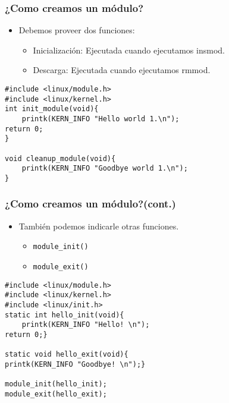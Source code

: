 \begin{frame}[fragile]
\frametitle{¿Como creamos un módulo?}
  \begin{itemize}
  \item Debemos proveer dos funciones:
 	 \begin{itemize}
 	   \item Inicialización: Ejecutada cuando ejecutamos insmod.
 	 \end{itemize} 
	 \begin{itemize}
 	   \item Descarga: Ejecutada cuando ejecutamos rmmod.
 	 \end{itemize} 
  \end{itemize}

\begin{lstlisting}
#include <linux/module.h> 
#include <linux/kernel.h> 
int init_module(void){
	printk(KERN_INFO "Hello world 1.\n");
return 0;
}

void cleanup_module(void){
	printk(KERN_INFO "Goodbye world 1.\n");
}
\end{lstlisting}
\end{frame}


\begin{frame}[fragile]
\frametitle{¿Como creamos un módulo?(cont.)}
  \begin{itemize}
  \item También podemos indicarle otras funciones.
 	 \begin{itemize}
 	   \item \texttt{module\_init()}
	   \item \texttt{module\_exit()}
 	 \end{itemize} 
  \end{itemize}

\begin{lstlisting}
#include <linux/module.h>
#include <linux/kernel.h>
#include <linux/init.h>
static int hello_init(void){
	printk(KERN_INFO "Hello! \n");
return 0;}

static void hello_exit(void){
printk(KERN_INFO "Goodbye! \n");}

module_init(hello_init);
module_exit(hello_exit);
\end{lstlisting}
\end{frame}

